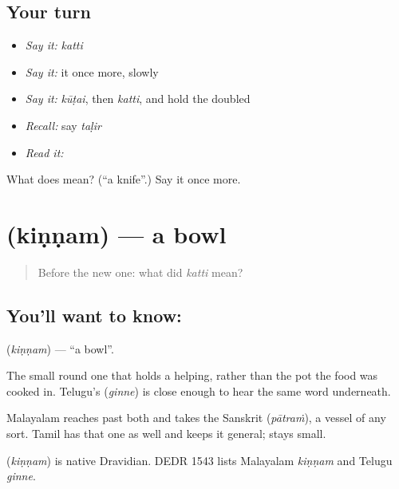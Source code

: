 \subsection*{Your turn}
\begin{itemize}
\raggedright
  \item \emph{Say it:} \emph{katti}
  \item \emph{Say it:} it once more, slowly
  \item \emph{Say it:} \emph{kūṭai}, then \emph{katti}, and hold the doubled 
  \item \emph{Recall:} say \emph{taḷir}
  \item \emph{Read it:} \textbf{}
\end{itemize}

\begin{tcolorbox}[breakable,colback=teal!4,colframe=teal!35!black,title={Before you move on}]
What does  mean? (\textquotedblleft{}a knife\textquotedblright{}.) Say it once more.
\end{tcolorbox}
\section[\texorpdfstring{\ta{கிண்ணம்} (kiṇṇam)}{கிண்ணம் (kiṇṇam)}]{ (kiṇṇam) — a bowl}

\label{lesson:TA-C54-bowl}



\begin{quote}
Before the new one: what did \emph{katti} mean?
\end{quote}

\subsection*{You'll want to know: }
\textbf{} (\emph{kiṇṇam}) — \textquotedblleft{}a bowl\textquotedblright{}.

The small round one that holds a helping, rather than the pot the food was cooked in. Telugu's  (\emph{ginne}) is close enough to hear the same word underneath.

Malayalam reaches past both and takes the Sanskrit  (\emph{pātraṁ}), a vessel of any sort. Tamil has that one as well and keeps it general;  stays small.

\begin{cousinweb}
\textbf{} (\emph{kiṇṇam}) is native Dravidian. DEDR 1543 lists Malayalam \emph{kiṇṇam} and Telugu \emph{ginne}.
\end{cousinweb}

